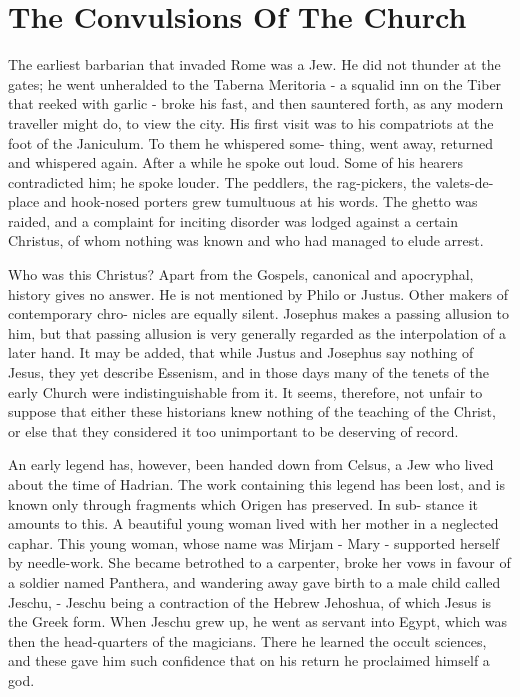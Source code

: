 \documentclass[]{book}
\begin{document}
\chapter{The Convulsions Of The
Church}\label{the-convulsions-of-the-church}

The earliest barbarian that invaded Rome was a Jew. He did not thunder
at the gates; he went unheralded to the Taberna Meritoria - a squalid
inn on the Tiber that reeked with garlic - broke his fast, and then
sauntered forth, as any modern traveller might do, to view the city. His
first visit was to his compatriots at the foot of the Janiculum. To them
he whispered some- thing, went away, returned and whispered again. After
a while he spoke out loud. Some of his hearers contradicted him; he
spoke louder. The peddlers, the rag-pickers, the valets-de-place and
hook-nosed porters grew tumultuous at his words. The ghetto was raided,
and a complaint for inciting disorder was lodged against a certain
Christus, of whom nothing was known and who had managed to elude arrest.

Who was this Christus? Apart from the Gospels, canonical and apocryphal,
history gives no answer. He is not mentioned by Philo or Justus. Other
makers of contemporary chro- nicles are equally silent. Josephus makes a
passing allusion to him, but that passing allusion is very generally
regarded as the interpolation of a later hand. It may be added, that
while Justus and Josephus say nothing of Jesus, they yet describe
Essenism, and in those days many of the tenets of the early Church were
indistinguishable from it. It seems, therefore, not unfair to suppose
that either these historians knew nothing of the teaching of the Christ,
or else that they considered it too unimportant to be deserving of
record.

An early legend has, however, been handed down from Celsus, a Jew who
lived about the time of Hadrian. The work containing this legend has
been lost, and is known only through fragments which Origen has
preserved. In sub- stance it amounts to this. A beautiful young woman
lived with her mother in a neglected caphar. This young woman, whose
name was Mirjam - Mary - supported herself by needle-work. She became
betrothed to a carpenter, broke her vows in favour of a soldier named
Panthera, and wandering away gave birth to a male child called Jeschu, -
Jeschu being a contraction of the Hebrew Jehoshua, of which Jesus is the
Greek form. When Jeschu grew up, he went as servant into Egypt, which
was then the head-quarters of the magicians. There he learned the occult
sciences, and these gave him such confidence that on his return he
proclaimed himself a god.
\end{document}
